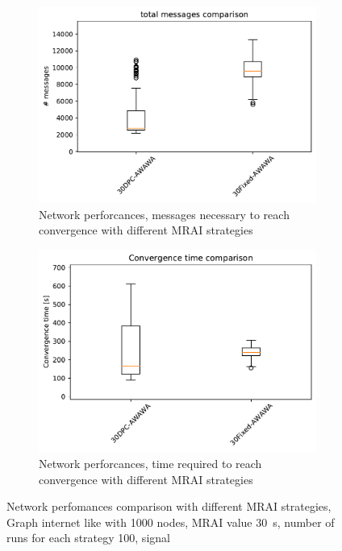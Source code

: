 \begin{figure}[h]
     \centering
     \begin{subfigure}[b]{0.45\textwidth}
         \centering
         \includegraphics[width=\textwidth]{images/internet_like/1000/comparison/comparison_AWAWA_messages_boxplot.pdf}
		 \caption{Network perforcances, messages necessary to reach convergence
			with different \ac{MRAI} strategies}
         \label{fig:boxplot_internet_like_1000_messages_AWAWA}
     \end{subfigure}
     \hfill
     \begin{subfigure}[b]{0.45\textwidth}
         \centering
         \includegraphics[width=\textwidth]{images/internet_like/1000/comparison/comparison_AWAWA_time_boxplot.pdf}
		 \caption{Network perforcances, time required to reach convergence
			with different \ac{MRAI} strategies}
         \label{fig:boxplot_internet_like_1000_time_AWAWA}
     \end{subfigure}
	 \caption{Network perfomances comparison with different \ac{MRAI} strategies,
		Graph internet like with \num{1000} nodes, \ac{MRAI} value 
		\SI{30}{\second}, number of runs for each strategy \num{100}, signal }
        \label{fig:boxplot_internet_like_1000_AWAWA}
\end{figure}

\clearpage
